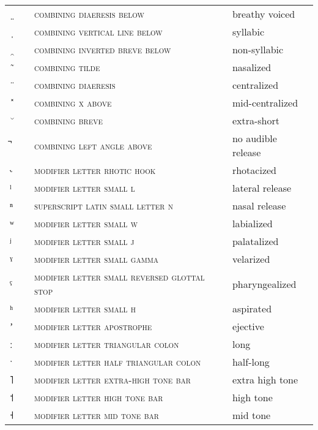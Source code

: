 \begin{center}
\begin{xtabular}{ l L{1.2cm} L{5.6cm} L{4cm} }
{\large \ ̤} &  & \textsc{combining diaeresis below} & breathy voiced \\
{\large \ ̩} &  & \textsc{combining vertical line below} & syllabic \\
{\large \ ̯} &  & \textsc{combining inverted breve below} & non-syllabic \\
\midrule
{\large \ ̃} &  & \textsc{combining tilde} & nasalized \\
{\large \ ̈} &  & \textsc{combining diaeresis} & centralized \\
{\large \ ̽} &  & \textsc{combining x above} & mid-centralized \\
{\large \ ̆} &  & \textsc{combining breve} & extra-short \\
{\large ̚} &  & \textsc{combining left angle above} & no audible release \\
\midrule
{\large ˞} &  & \textsc{modifier letter rhotic hook} & rhotacized \\
{\large ˡ} &  & \textsc{modifier letter small l} & lateral release \\
{\large ⁿ} &  & \textsc{superscript latin small letter n} & nasal release \\
{\large ʷ} &  & \textsc{modifier letter small w} & labialized \\
{\large ʲ} &  & \textsc{modifier letter small j} & palatalized \\
{\large ˠ} &  & \textsc{modifier letter small gamma} & velarized \\
{\large ˤ} &  & \textsc{modifier letter small reversed glottal stop} & pharyngealized \\
{\large ʰ} &  & \textsc{modifier letter small h} & aspirated \\
{\large ʼ} &  & \textsc{modifier letter apostrophe} & ejective \\
{\large ː} &  & \textsc{modifier letter triangular colon} & long \\
{\large ˑ} &  & \textsc{modifier letter half triangular colon} & half-long \\
\midrule
{˥} &  & \textsc{modifier letter extra-high tone bar} & extra high tone \\
{˦} &  & \textsc{modifier letter high tone bar} & high tone \\
{˧} &  & \textsc{modifier letter mid tone bar} & mid tone \\

\end{xtabular}
\end{center}
